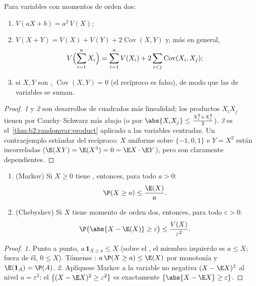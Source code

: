 \begin{theorem}\label{thm:b2:randomvar:variancerules}
Para variables con momentos de orden dos:
\begin{enumerate}
\item $V(aX + b) = a^2\,V(X)$;
\item $V(X + Y) = V(X) + V(Y) + 2\operatorname{Cov}(X, Y)$ y, más en
general,
\[
V\Bigl(\sum_{i=1}^n X_i\Bigr)
= \sum_{i=1}^n V(X_i)
+ 2\sum_{i < j}\operatorname{Cov}(X_i, X_j) ;
\]
\item si $X, Y$ son , $\operatorname{Cov}(X, Y) = 0$
(el recíproco es falso), de modo que las  de variables
 se suman.
\end{enumerate}
\end{theorem}

\begin{proof}
\emph{1} y \emph{2} son desarrollos de cuadrados más linealidad; los
productos $X_iX_j$ tienen  por Cauchy--Schwarz más abajo (o
por $\abs{X_iX_j} \leq \frac{X_i^2 + X_j^2}{2}$). \emph{3} es el~\cref{thm:b2:randomvar:product} aplicado a las variables centradas.
Un contraejemplo estándar del recíproco: $X$ uniforme sobre $\{-1, 0,
1\}$ e $Y = X^2$ están incorreladas ($\E(XY) = \E(X^3) = 0 = \E X
\cdot \E Y$), pero son claramente dependientes.
\end{proof}

\begin{theorem}\label{thm:b2:randomvar:markov}
\leavevmode
\begin{enumerate}
\item (Markov) Si $X \geq 0$ tiene , entonces, para todo $a
> 0$:
\[
\P(X \geq a) \leq \frac{\E(X)}{a} .
\]
\item (Chebyshev) Si $X$ tiene momento de orden dos, entonces, para
todo $\varepsilon > 0$:
\[
\P\bigl(\abs{X - \E(X)} \geq \varepsilon\bigr)
\leq \frac{V(X)}{\varepsilon^2} .
\]
\end{enumerate}
\end{theorem}

\begin{proof}
\emph{1.} Punto a punto, $a\,\mathbf{1}_{X \geq a} \leq X$ (sobre el
, el miembro izquierdo es $a \leq X$; fuera de él, $0 \leq
X$). Tómense : $a\,\P(X \geq a) \leq \E(X)$ por monotonía y
$\E(\mathbf{1}_A) = \P(A)$. \emph{2.} Aplíquese Markov a la variable
no negativa $(X - \E X)^2$ al nivel $a = \varepsilon^2$: el 
$\{(X - \E X)^2 \geq \varepsilon^2\}$ es exactamente $\{\abs{X - \E
X} \geq \varepsilon\}$.
\end{proof}


